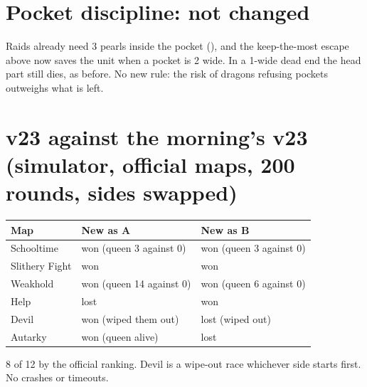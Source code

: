 \documentclass[11pt,a4paper]{article}
\newcommand{\code}[1]{\texttt{\detokenize{#1}}}
\begin{document}
\section{Pocket discipline: not changed}
Raids already need 3 pearls inside the pocket (\code{POCKET_MIN_PEARLS}), and the keep-the-most escape above now saves the unit
when a pocket is 2 wide. In a 1-wide dead end the head part still dies, as before. No new rule: the risk of dragons refusing pockets
outweighs what is left.

\section{v23 against the morning's v23 (simulator, official maps, 200 rounds, sides swapped)}
\begin{center}
      \begin{tabular}{@{}lll@{}}
            \toprule
            Map            & New as A                 & New as B                \\
            \midrule
            Schooltime     & won (queen 3 against 0)  & won (queen 3 against 0) \\
            Slithery Fight & won                      & won                     \\
            Weakhold       & won (queen 14 against 0) & won (queen 6 against 0) \\
            Help           & lost                     & won                     \\
            Devil          & won (wiped them out)     & lost (wiped out)        \\
            Autarky        & won (queen alive)        & lost                    \\
            \bottomrule
      \end{tabular}
\end{center}
8 of 12 by the official ranking. Devil is a wipe-out race whichever side starts first. No crashes or timeouts.
\end{document}
